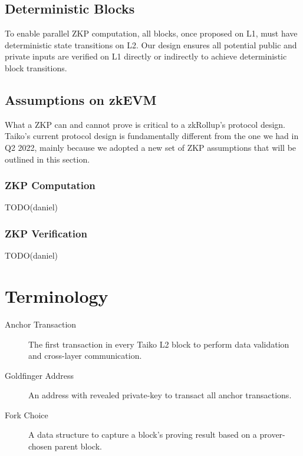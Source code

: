 \documentclass[9pt,oneside]{amsart}
\begin{document}
\begin{multicols}{2}
\subsection{Deterministic Blocks}
To enable parallel ZKP computation, all blocks, once proposed on L1, must have deterministic state transitions on L2. Our design ensures all potential public and private inputs are verified on L1 directly or indirectly to achieve deterministic block transitions.

\subsection{Assumptions on zkEVM}

What a ZKP can and cannot prove is critical to a zkRollup's protocol design. Taiko's current protocol design is fundamentally different from the one we had in Q2 2022, mainly because we adopted a new set of ZKP assumptions that will be outlined in this section.


\subsubsection{ZKP Computation}

\color{brown}
TODO(daniel)
\color{black}

\subsubsection{ZKP Verification}

\color{brown}
TODO(daniel)
\color{black}

\end{multicols}




\appendix

\section{Terminology} \label{ch:Terminology}

\begin{description}
\item[Anchor Transaction] The first transaction in every Taiko L2 block to perform data validation and cross-layer communication.

\item[Goldfinger Address] An address with revealed private-key to transact all anchor transactions.

\item[Fork Choice] A data structure to capture a block's proving result based on a prover-chosen parent block.

\end{description}
\end{document}
